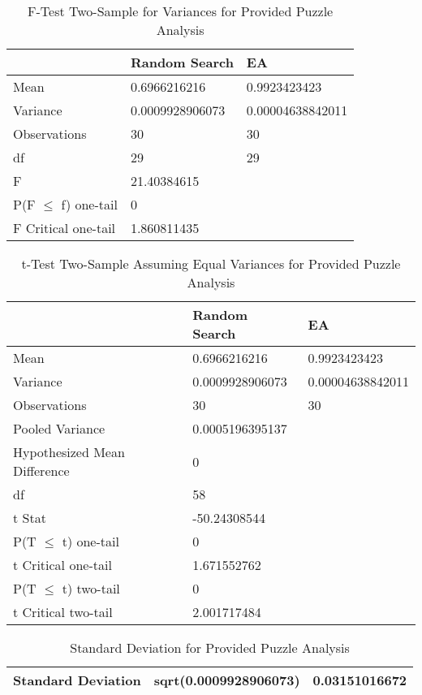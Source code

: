 \documentclass[11pt]{article}
\begin{document}
\begin{table}[H]
\centering
\caption{F-Test Two-Sample for Variances for Provided Puzzle Analysis}
\label{my-label}
\begin{tabular}{l|l|l}
 & Random Search & EA \\ \hline
Mean & 0.6966216216 & 0.9923423423 \\
Variance & 0.0009928906073 & 0.00004638842011 \\
Observations & 30 & 30 \\
df & 29 & 29 \\
F & 21.40384615 &  \\
P(F $\leq$ f) one-tail & 0 &  \\
F Critical one-tail & 1.860811435 & 
\end{tabular}
\end{table}


\begin{table}[H]
\centering
\caption{t-Test Two-Sample Assuming Equal Variances for Provided Puzzle Analysis}
\label{my-label}
\begin{tabular}{l|l|l}
 & Random Search & EA \\ \hline
Mean & 0.6966216216 & 0.9923423423 \\
Variance & 0.0009928906073 & 0.00004638842011 \\
Observations & 30 & 30 \\
Pooled Variance & 0.0005196395137 &  \\
Hypothesized Mean Difference & 0 &  \\
df & 58 &  \\
t Stat & -50.24308544 &  \\
P(T $\leq$ t) one-tail & 0 &  \\
t Critical one-tail & 1.671552762 &  \\
P(T $\leq$ t) two-tail & 0 &  \\
t Critical two-tail & 2.001717484 &
\end{tabular}
\end{table}

\begin{table}[H]
\centering
\caption{Standard Deviation for Provided Puzzle Analysis}
\label{my-label}
\begin{tabular}{|l|l|l|}
\hline
Standard Deviation & sqrt(0.0009928906073) & 0.03151016672 \\ \hline
\end{tabular}
\end{table}
\end{document}
